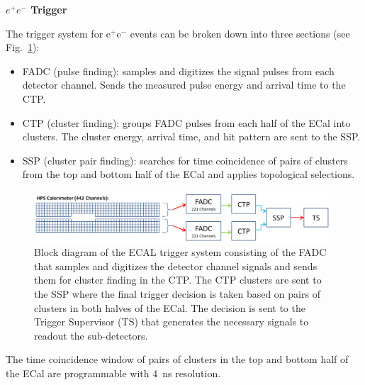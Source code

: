 


\vspace{1cm}
{\bf $e^+e^-$ Trigger} 


The trigger system for e$^+$e$^-$ events can be broken down into three sections (see Fig.~\ref{fig:hps_trigger_cal}):
 \begin{itemize}
 \item FADC (pulse finding): samples and digitizes the signal pulses from each detector channel. Sends the measured pulse energy and arrival time to the CTP.
\item CTP (cluster finding): groups FADC pulses from each half of the ECal into clusters. The cluster energy, arrival time, and hit pattern are sent to the SSP.
 \item SSP (cluster pair finding): searches for time coincidence of pairs of clusters from the top and bottom half of the ECal and applies topological selections.
\end{itemize}
 \begin{figure}[t]
 \includegraphics[scale=0.25]{daq_trigger/figures/hps_trigger_cal}
\caption{\small{Block diagram of the ECAL trigger system consisting of the FADC that samples and digitizes the detector channel signals and sends them for cluster finding in the CTP. The CTP clusters are sent to the SSP where the final trigger decision is taken based on pairs of clusters in both halves of the ECal. The decision is sent to the Trigger Supervisor (TS) that generates the necessary signals to readout the sub-detectors.}}
 \label{fig:hps_trigger_cal}
 \end{figure}
The time coincidence window of pairs of clusters in the top and bottom half of the ECal are programmable with 4~ns resolution. 
